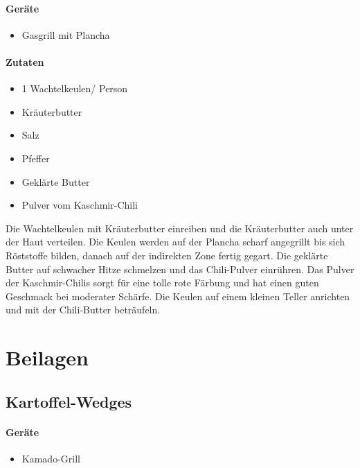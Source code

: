 \paragraph{Geräte}

\begin{itemize}[noitemsep]
	\item Gasgrill mit Plancha
\end{itemize}

\paragraph{Zutaten}

\begin{itemize}[noitemsep]
	\item 1 Wachtelkeulen/ Person
	\item Kräuterbutter
	\item Salz
	\item Pfeffer
	\item Geklärte Butter
	\item Pulver vom Kaschmir-Chili
\end{itemize}

Die Wachtelkeulen mit Kräuterbutter einreiben und die Kräuterbutter auch unter der Haut verteilen. Die Keulen werden auf der Plancha scharf angegrillt bis sich Röststoffe bilden, danach auf der indirekten Zone fertig gegart. Die geklärte Butter auf schwacher Hitze schmelzen und das Chili-Pulver einrühren. Das Pulver der Kaschmir-Chilis sorgt für eine tolle rote Färbung und hat einen guten  Geschmack bei moderater Schärfe. Die Keulen auf einem kleinen Teller anrichten und mit der Chili-Butter beträufeln.

\section{Beilagen}

\subsection{Kartoffel-Wedges}

\paragraph{Geräte}

\begin{itemize}[noitemsep]
	\item Kamado-Grill
\end{itemize}

